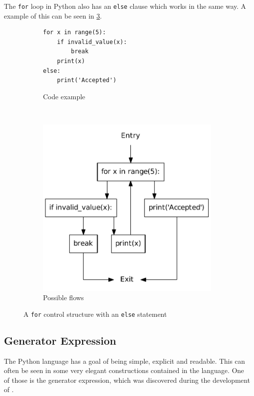 The \texttt{for} loop in Python also has an \texttt{else} clause which works in the same way.
A example of this can be seen in \cref{python:for:else}.

\begin{figure}
  \centering
  \begin{subfigure}[b]{0.4\textwidth}
    \begin{lstlisting}[style=python]
for x in range(5):
    if invalid_value(x):
        break
    print(x)
else:
    print('Accepted')
    \end{lstlisting}
    \caption{Code example}\label{python:for:else:code}
  \end{subfigure}
  ~ %
  \begin{subfigure}[b]{0.4\textwidth}
    \centering
    \includegraphics[scale=.5]{./figures/for_else.pdf}
    \caption{Possible flows}
    \label{python:for:else:flow}
  \end{subfigure}
  \caption{A \texttt{for} control structure with an \texttt{else} statement}
  \label{python:for:else}
\end{figure}

\subsection{Generator Expression}
The Python language has a goal of being simple, explicit and readable\citep{python_zen}.
This can often be seen in some very elegant constructions contained in the language.
One of those is the generator expression, which was discovered during the development of \pyt{}.

